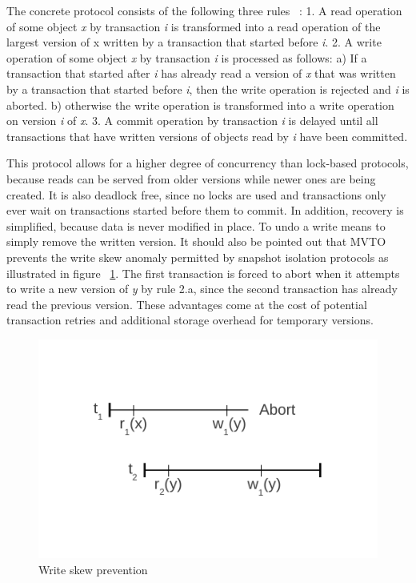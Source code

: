 \documentclass[10pt,final,journal]{IEEEtran}
\begin{document}
The concrete protocol consists of the following three rules ~\cite{Weikum:2001:TIS}:
1. A read operation of some object \emph{x} by transaction \emph{i} is transformed into a read operation of the largest version of x written by a transaction that started before \emph{i}.
2. A write operation of some object \emph{x} by transaction \emph{i} is processed as follows:
a) If a transaction that started after \emph{i} has already read a version of \emph{x} that was written by a transaction that started before \emph{i}, then the write operation is rejected and \emph{i} is aborted.
b) otherwise the write operation is transformed into a write operation on version \emph{i} of \emph{x}.
3. A commit operation by transaction \emph{i} is delayed until all transactions that have written versions of objects read by \emph{i} have been committed.

This protocol allows for a higher degree of concurrency than lock-based protocols, because reads can be served from older versions while newer ones are being created. It is also deadlock free, since no locks are used and transactions only ever wait on transactions started before them to commit. In addition, recovery is simplified, because data is never modified in place. To undo a write means to simply remove the written version. It should also be pointed out that MVTO prevents the write skew anomaly permitted by snapshot isolation protocols as illustrated in figure ~\ref{si}. The first transaction is forced to abort when it attempts to write a new version of \emph{y} by rule 2.a, since the second transaction has already read the previous version. These advantages come at the cost of potential transaction retries and additional storage overhead for temporary versions.

\begin{figure}[!t]
\centering
\includegraphics{images/si.pdf}
\caption{Write skew prevention}
\label{si}
\end{figure}
\end{document}
